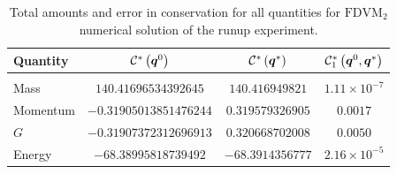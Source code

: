 \begin{table}
	\centering
	\begin{tabular}{l  c  c c}
		Quantity& $\mathcal{C}^*\left(\boldsymbol{q}^0\right)$ & $\mathcal{C}^*\left(\boldsymbol{q}^*\right)$ & $\mathcal{C}^*_1\left(\boldsymbol{q}^0,\boldsymbol{q}^*\right)$ \\
		\hline &&& \\
		Mass & $140.41696534392645$ & $140.416949821$ & $1.11\times 10^{-7}$\\
		Momentum & $-0.31905013851476244$ & $0.319579326905$ & $0.0017$\\
		$G$ & $-0.31907372312696913$ & $0.320668702008$ & $0.0050$\\
		Energy & $-68.38995818739492$ & $-68.3914356777 $ & $2.16 \times 10^{-5}$ \\
	\end{tabular}
	\caption{Total amounts and error in conservation for all quantities for $\text{FDVM}_2$ numerical solution of the runup experiment.}
	\label{tab:ConservationSynFDVM}
\end{table}


